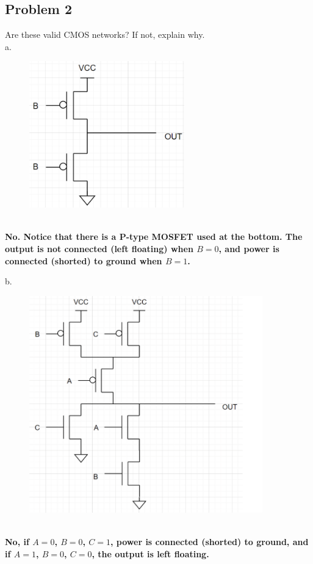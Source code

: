 \documentclass{article}
\begin{document}
\subsection*{Problem 2}
Are these valid CMOS networks? If not, explain why. \\

a.
\begin{figure}[!h]
        \centering
        \includegraphics[width=0.6\textwidth]{figures/CMOS_2a.png}
\end{figure}
\\
\textbf{No. Notice that there is a P-type MOSFET used at the bottom. The output is not connected (left floating) when $B = 0$, and power is connected (shorted) to ground when $B = 1$.}

\newpage

b.
\begin{figure}[!h]
        \centering
        \includegraphics[width=0.9\textwidth]{figures/CMOS_2b.png}
\end{figure}
\\
\textbf{No, if $A = 0$, $B = 0$, $C = 1$, power is connected (shorted) to ground, and if $A = 1$, $B = 0$, $C = 0$, the output is left floating.}
\end{document}
